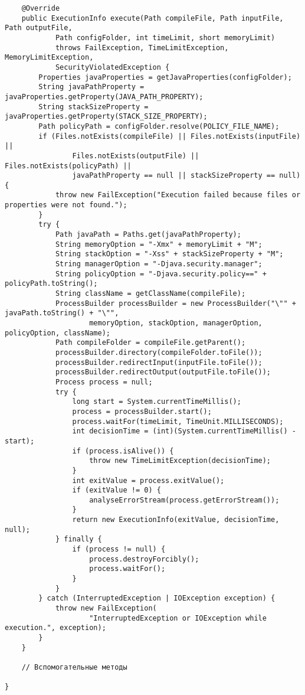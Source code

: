 \begin{verbatim}
    @Override
    public ExecutionInfo execute(Path compileFile, Path inputFile, Path outputFile,
            Path configFolder, int timeLimit, short memoryLimit)
            throws FailException, TimeLimitException, MemoryLimitException,
            SecurityViolatedException {
        Properties javaProperties = getJavaProperties(configFolder);
        String javaPathProperty = javaProperties.getProperty(JAVA_PATH_PROPERTY);
        String stackSizeProperty = javaProperties.getProperty(STACK_SIZE_PROPERTY);
        Path policyPath = configFolder.resolve(POLICY_FILE_NAME);
        if (Files.notExists(compileFile) || Files.notExists(inputFile) ||
                Files.notExists(outputFile) || Files.notExists(policyPath) ||
                javaPathProperty == null || stackSizeProperty == null) {
            throw new FailException("Execution failed because files or properties were not found.");
        }
        try {
            Path javaPath = Paths.get(javaPathProperty);
            String memoryOption = "-Xmx" + memoryLimit + "M";
            String stackOption = "-Xss" + stackSizeProperty + "M";
            String managerOption = "-Djava.security.manager";
            String policyOption = "-Djava.security.policy==" + policyPath.toString();
            String className = getClassName(compileFile);
            ProcessBuilder processBuilder = new ProcessBuilder("\"" + javaPath.toString() + "\"",
                    memoryOption, stackOption, managerOption, policyOption, className);
            Path compileFolder = compileFile.getParent();
            processBuilder.directory(compileFolder.toFile());
            processBuilder.redirectInput(inputFile.toFile());
            processBuilder.redirectOutput(outputFile.toFile());
            Process process = null;
            try {
                long start = System.currentTimeMillis();
                process = processBuilder.start();
                process.waitFor(timeLimit, TimeUnit.MILLISECONDS);
                int decisionTime = (int)(System.currentTimeMillis() - start);
                if (process.isAlive()) {
                    throw new TimeLimitException(decisionTime);
                }
                int exitValue = process.exitValue();
                if (exitValue != 0) {
                    analyseErrorStream(process.getErrorStream());
                }
                return new ExecutionInfo(exitValue, decisionTime, null);
            } finally {
                if (process != null) {
                    process.destroyForcibly();
                    process.waitFor();
                }
            }
        } catch (InterruptedException | IOException exception) {
            throw new FailException(
                    "InterruptedException or IOException while execution.", exception);
        }
    }
    
    // Вспомогательные методы

}
\end{verbatim}

